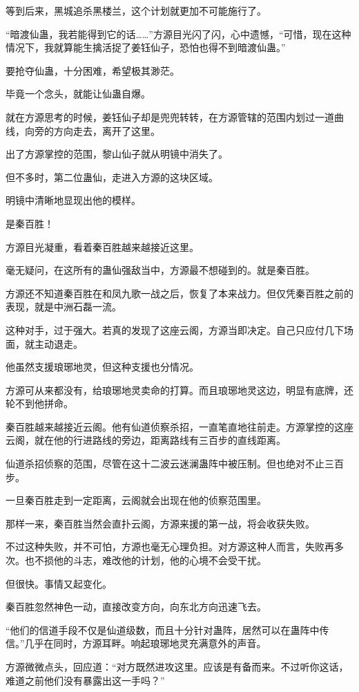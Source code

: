 \begin{this_body}
等到后来，黑城追杀黑楼兰，这个计划就更加不可能施行了。

“暗渡仙蛊，我若能得到它的话……”方源目光闪了闪，心中遗憾，“可惜，现在这种情况下，我就算能生擒活捉了姜钰仙子，恐怕也得不到暗渡仙蛊。”

要抢夺仙蛊，十分困难，希望极其渺茫。

毕竟一个念头，就能让仙蛊自爆。

就在方源思考的时候，姜钰仙子却是兜兜转转，在方源管辖的范围内划过一道曲线，向旁的方向走去，离开了这里。

出了方源掌控的范围，黎山仙子就从明镜中消失了。

但不多时，第二位蛊仙，走进入方源的这块区域。

明镜中清晰地显现出他的模样。

是秦百胜！

方源目光凝重，看着秦百胜越来越接近这里。

毫无疑问，在这所有的蛊仙强敌当中，方源最不想碰到的。就是秦百胜。

方源还不知道秦百胜在和凤九歌一战之后，恢复了本来战力。但仅凭秦百胜之前的表现，就是中洲石磊一流。

这种对手，过于强大。若真的发现了这座云阁，方源当即决定。自己只应付几下场面，就主动退走。

他虽然支援琅琊地灵，但这种支援也分情况。

方源可从来都没有，给琅琊地灵卖命的打算。而且琅琊地灵这边，明显有底牌，还轮不到他拼命。

秦百胜越来越接近云阁。他有仙道侦察杀招，一直笔直地往前走。方源掌控的这座云阁，就在他的行进路线的旁边，距离路线有三百步的直线距离。

仙道杀招侦察的范围，尽管在这十二波云迷澜蛊阵中被压制。但也绝对不止三百步。

一旦秦百胜走到一定距离，云阁就会出现在他的侦察范围里。

那样一来，秦百胜当然会直扑云阁，方源来援的第一战，将会收获失败。

不过这种失败，并不可怕，方源也毫无心理负担。对方源这种人而言，失败再多次。也不损他的斗志，难改他的计划，他的心境不会受干扰。

但很快。事情又起变化。

秦百胜忽然神色一动，直接改变方向，向东北方向迅速飞去。

“他们的信道手段不仅是仙道级数，而且十分针对蛊阵，居然可以在蛊阵中传信。”几乎在同时，方源耳畔。响起琅琊地灵充满意外的声音。

方源微微点头，回应道：“对方既然进攻这里。应该是有备而来。不过听你这话，难道之前他们没有暴露出这一手吗？”


\end{this_body}
